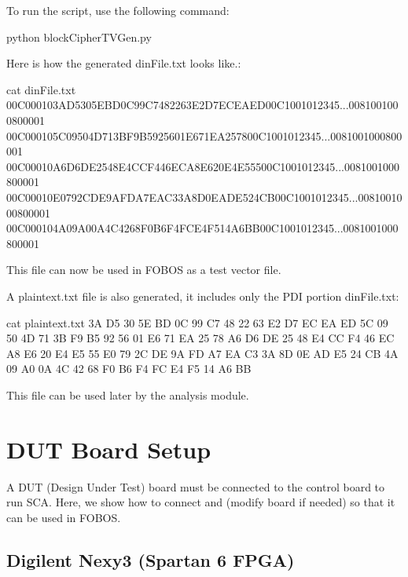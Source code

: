 \documentclass[letterpaper,10pt,english]{sphinxmanual}
\begin{document}
To run the script, use the following command:

\begin{sphinxVerbatim}[commandchars=\\\{\}]
\PYGZdl{} python blockCipherTVGen.py
\end{sphinxVerbatim}

Here is how the generated dinFile.txt looks like.:

\begin{sphinxVerbatim}[commandchars=\\\{\}]
\PYGZdl{} cat dinFile.txt
00C000103AD5305EBD0C99C7482263E2D7ECEAED00C1001012345...0081001000800001
00C000105C09504D713BF9B5925601E671EA257800C1001012345...0081001000800001
00C00010A6D6DE2548E4CCF446ECA8E620E4E55500C1001012345...0081001000800001
00C00010E0792CDE9AFDA7EAC33A8D0EADE524CB00C1001012345...0081001000800001
00C000104A09A00A4C4268F0B6F4FCE4F514A6BB00C1001012345...0081001000800001
\end{sphinxVerbatim}

This file can now be used in FOBOS as a test vector file.

A plaintext.txt file is also generated, it includes only the PDI portion dinFile.txt:

\begin{sphinxVerbatim}[commandchars=\\\{\}]
\PYGZdl{} cat plaintext.txt
3A D5 30 5E BD 0C 99 C7 48 22 63 E2 D7 EC EA ED
5C 09 50 4D 71 3B F9 B5 92 56 01 E6 71 EA 25 78
A6 D6 DE 25 48 E4 CC F4 46 EC A8 E6 20 E4 E5 55
E0 79 2C DE 9A FD A7 EA C3 3A 8D 0E AD E5 24 CB
4A 09 A0 0A 4C 42 68 F0 B6 F4 FC E4 F5 14 A6 BB
\end{sphinxVerbatim}

This file can be used later by the analysis module.


\chapter{DUT Board Setup}
\label{\detokenize{dut_board_setup:dut-board-setup}}\label{\detokenize{dut_board_setup:dut-board-setup-label}}\label{\detokenize{dut_board_setup::doc}}
A DUT (Design Under Test) board must be connected to the control board to run SCA. Here,
we show how to connect and (modify board if needed) so that it can be used in FOBOS.


\section{Digilent Nexy3 (Spartan 6 FPGA)}
\label{\detokenize{dut_board_setup:digilent-nexy3-spartan-6-fpga}}
\end{document}
